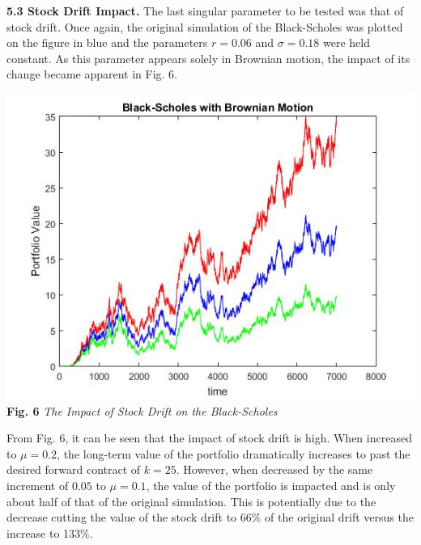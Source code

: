 \documentclass{report}
\begin{document}
	\textbf{5.3 Stock Drift Impact.} The last singular parameter to be tested was that of stock drift. Once again, the original simulation of the Black-Scholes was plotted on the figure in blue and the parameters $r = 0.06$ and $\sigma = 0.18$ were held constant. As this parameter appears solely in Brownian motion, the impact of its change became apparent in Fig. 6.
	\begin{center}
		\includegraphics[scale=0.4]{driftimpact}
		\\ \textbf{Fig. 6} \textit{The Impact of Stock Drift on the Black-Scholes}
	\end{center}
	
	From Fig. 6, it can be seen that the impact of stock drift is high. When increased to $\mu  = 0.2$, the long-term value of the portfolio dramatically increases to past the desired forward contract of $k=25$. However, when decreased by the same increment of $0.05$ to $\mu = 0.1$, the value of the portfolio is impacted and is only about half of that of the original simulation. This is potentially due to the decrease cutting the value of the stock drift to 66\% of the original drift versus the increase to 133\%.
	\\
	
\end{document}
